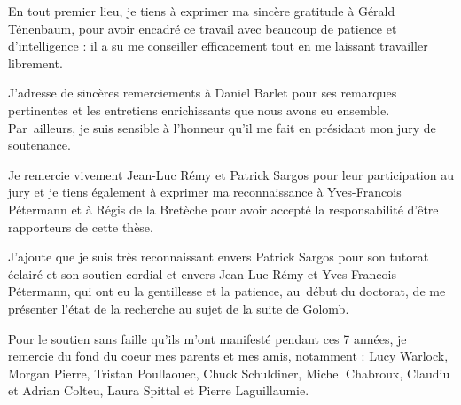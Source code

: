 %
%
%
\SecLabelEqtrue             %
\NumReftrue                    %

\bigskip
\bigskip
En tout premier lieu, je tiens \`a exprimer ma sinc\`ere gratitude \`a G\'erald T\'enenbaum, pour avoir encadr\'e ce travail avec beaucoup de patience et d'intelligence : 
il a su me conseiller efficacement tout en me laissant travailler librement. 
\medskip

J'adresse de sinc\`eres remerciements \`a Daniel Barlet pour ses remarques pertinentes et les entretiens enrichissants que nous avons eu ensemble.  
Par~ailleurs, je suis sensible \`a l'honneur qu'il me fait en pr\'esidant mon jury de soutenance.
\medskip

Je remercie vivement Jean-Luc R\'emy et Patrick Sargos pour leur participation au jury et 
je tiens \'egalement \`a exprimer ma reconnaissance \`a  Yves-Francois P\'etermann et \`a R\'egis de la Bret\`eche pour avoir accept\'e la responsabilit\'e d'\^etre rapporteurs de cette th\`ese. 
\medskip

J'ajoute que je suis tr\`es reconnaissant envers Patrick Sargos pour son tutorat \'eclair\'e et son soutien cordial et envers 
Jean-Luc R\'emy et Yves-Francois P\'etermann, qui ont eu la gentillesse et la patience, au~d\'ebut du doctorat, de me pr\'esenter l'\'etat de la recherche au sujet de la suite de Golomb. 
\medskip

Pour le soutien sans faille qu'ils m'ont manifest\'e pendant ces 7 ann\'ees, je remercie du fond du coeur mes parents et mes amis, notamment :
Lucy Warlock, Morgan Pierre, Tristan Poullaouec, Chuck Schuldiner, Michel Chabroux, Claudiu et Adrian Colteu, Laura Spittal et Pierre Laguillaumie. 

